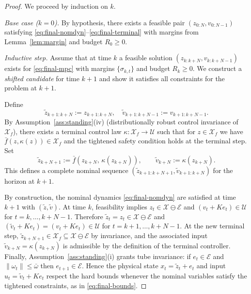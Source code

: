 \documentclass[journal]{IEEEtran}
\theoremstyle{definition}
\begin{document}
\begin{proof}
We proceed by induction on $k$.

\textit{Base case ($k=0$).}
By hypothesis, there exists a feasible pair $(z_{0:N},v_{0:N-1})$ satisfying
\eqref{eq:final-nomdyn}--\eqref{eq:final-terminal} with margins from Lemma~\ref{lem:margin}
and budget $R_0\ge 0$.

\textit{Inductive step.}
Assume that at time $k$ a feasible solution
$(z_{k:k+N},v_{k:k+N-1})$ exists for \eqref{eq:final-mpc} with margins $\{\sigma_{k,t}\}$
and budget $R_k\ge 0$. We construct a \emph{shifted candidate} for time $k{+}1$ and show it
satisfies all constraints for the problem at $k{+}1$.

 
Define
\[
\tilde z_{k+1:k+N}\!:=\!z_{k+1:k+N},\quad
\tilde v_{k+1:k+N-1}\!:=\!v_{k+1:k+N-1}.
\]
By Assumption~\ref{ass:standing}(iv) (distributionally robust control invariance of
$\mathcal{X}_f$), there exists a terminal control law $\kappa:\mathcal{X}_f\to\mathcal{U}$
such that for $z\in\mathcal{X}_f$ we have $\bar f(z,\kappa(z))\in\mathcal{X}_f$ and
the tightened safety condition holds at the terminal step. Set
\[
\tilde z_{k+N+1}:=\bar f(z_{k+N},\,\kappa(z_{k+N})),\qquad
\tilde v_{k+N}:=\kappa(z_{k+N}).
\]
This defines a complete nominal sequence $(\tilde z_{k+1:k+N+1},\tilde v_{k+1:k+N})$
for the horizon at $k{+}1$.

 
By construction, the nominal dynamics \eqref{eq:final-nomdyn} are satisfied at time $k{+}1$
with $(\tilde z,\tilde v)$. At time $k$, feasibility implies
$z_t\in\mathcal{X}\ominus\mathcal{E}$ and $(v_t+Ke_t)\in\mathcal{U}$ for $t=k,\dots,k{+}N{-}1$.
Therefore $\tilde z_t=z_t\in\mathcal{X}\ominus\mathcal{E}$ and
$(\tilde v_t+Ke_t)=(v_t+Ke_t)\in\mathcal{U}$ for $t=k{+}1,\dots,k{+}N{-}1$.
At the new terminal step, $\tilde z_{k+N+1}\in\mathcal{X}_f\subseteq\mathcal{X}\ominus\mathcal{E}$
by invariance, and the associated input $\tilde v_{k+N}=\kappa(z_{k+N})$ is admissible by the
definition of the terminal controller. Finally, Assumption~\ref{ass:standing}(i) grants
tube invariance: if $e_t\in\mathcal{E}$ and $\|\omega_t\|\le\bar\omega$ then $e_{t+1}\in\mathcal{E}$.
Hence the physical state $x_t=\tilde z_t+e_t$ and input $u_t=\tilde v_t+Ke_t$ respect
the hard bounds whenever the nominal variables satisfy the tightened constraints, as in
\eqref{eq:final-bounds}.


\end{proof}
\end{document}
